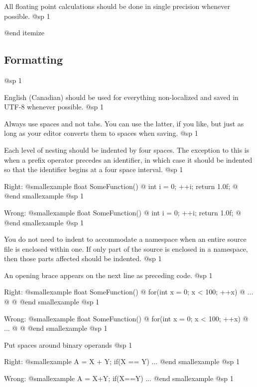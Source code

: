 \item
All floating point calculations should be done in single precision whenever possible.
@sp 1

@end itemize

\subsection{Formatting}
@sp 1

\itemize

\item
English (Canadian) should be used for everything non-localized and saved in UTF-8 whenever possible.
@sp 1

\item
Always use spaces and not tabs. You can use the latter, if you like, but just as long as your editor converts them to spaces when saving.
@sp 1

\item
Each level of nesting should be indented by four spaces. The exception to this is when a prefix operator precedes an identifier, in which case it should be indented so that the identifier begins at a four space interval.
@sp 1

Right:
@smallexample
float SomeFunction()
@{
    int i = 0;
  ++i;
    return 1.0f;
@}
@end smallexample
@sp 1

Wrong:
@smallexample
float SomeFunction()
@{
    int i = 0;
    ++i;
        return 1.0f;
@}
@end smallexample
@sp 1

\item
You do not need to indent to accommodate a namespace when an entire source file is enclosed within one. If only part of the source is enclosed in a namespace, then those parts affected should be indented.
@sp 1

\item
An opening brace appears on the next line as preceding code.
@sp 1

Right:
@smallexample
float SomeFunction()
@{
    for(int x = 0; x < 100; ++x)
    @{
        ...
    @}
@}
@end smallexample
@sp 1

Wrong:
@smallexample
float SomeFunction() @{
    for(int x = 0; x < 100; ++x) @{
        ...
    @}
@}
@end smallexample
@sp 1

\item
Put spaces around binary operands
@sp 1

Right:
@smallexample
A = X + Y;
if(X == Y)
    ...
@end smallexample
@sp 1

Wrong:
@smallexample
A = X+Y;
if(X==Y)
    ...
@end smallexample
@sp 1

